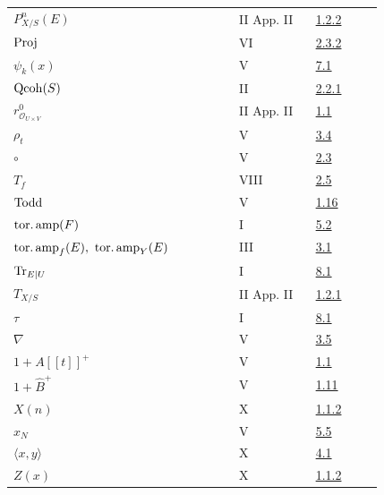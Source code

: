 \begin{longtable}{@{}>{\raggedright\arraybackslash}p{0.50\linewidth}>{\raggedright\arraybackslash}p{0.17\linewidth}>{\raggedright\arraybackslash}p{0.15\linewidth}@{}}
\(P^n_{X/S}(E)\) & II App. II & \hyperlink{sga6.e02.para.1-2-2}{1.2.2}\\
\(\operatorname{Proj}\) & VI & \hyperlink{sga6.e06.para.2-3-2}{2.3.2}\\
\(\psi_k(x)\) & V & \hyperlink{sga6.e05.para.7-1}{7.1}\\
\(\operatorname{Qcoh}(S)\) & II & \hyperlink{sga6.e02.notation.2-2-1}{2.2.1}\\
\(r^0_{\mathcal O_{U\times V}}\) & II App. II & \hyperlink{sga6.e02.sec.1.1}{1.1}\\
\(\rho_t\) & V & \hyperlink{sga6.e05.para.3-4}{3.4}\\
\(\circ\) & V & \hyperlink{sga6.e05.para.2-3}{2.3}\\
\(T_f\) & VIII & \hyperlink{sga6.e08.cor.2-5}{2.5}\\
\(\operatorname{Todd}\) & V & \hyperlink{sga6.e05.para.1-16}{1.16}\\
\(\operatorname{tor.amp}(F)\) & I & \hyperlink{sga6.e01.def.5-2}{5.2}\\
\(\toramp_f(E),\ \toramp_Y(E)\) & III & \hyperlink{sga6.e03.def.3-1}{3.1}\\
\(\operatorname{Tr}_{E|U}\) & I & \hyperlink{sga6.e01.para.8-1}{8.1}\\
\(T_{X/S}\) & II App. II & \hyperlink{sga6.e02.para.1-2-1}{1.2.1}\\
\(\tau\) & I & \hyperlink{sga6.e01.para.8-1}{8.1}\\
\(\nabla\) & V & \hyperlink{sga6.e05.para.3-5}{3.5}\\
\(1+A[[t]]^+\) & V & \hyperlink{sga6.e05.para.1-1}{1.1}\\
\(1+\widehat B^+\) & V & \hyperlink{sga6.e05.para.1-11}{1.11}\\
\(X(n)\) & X & \hyperlink{sga6.e10.prop.1-1-2}{1.1.2}\\
\(x_N\) & V & \hyperlink{sga6.e05.para.5-5}{5.5}\\
\(\langle x,y\rangle\) & X & \hyperlink{sga6.e10.sec.4.1}{4.1}\\
\(Z(x)\) & X & \hyperlink{sga6.e10.prop.1-1-2}{1.1.2}\\
\bottomrule
\end{longtable}
\endgroup
